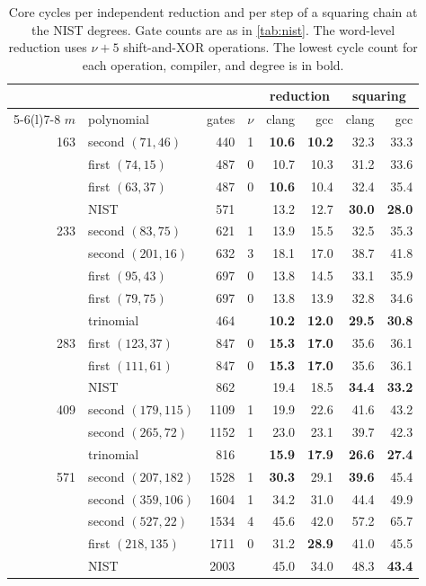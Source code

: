 \documentclass{ieeeaccess}
\theoremstyle{plain}
\theoremstyle{definition}
\begin{document}
\begin{table}[t]
\centering\small
\caption{Core cycles per independent reduction and per step of a
squaring chain at the NIST degrees. Gate counts are as in
\cref{tab:nist}. The word-level reduction uses $\nu+5$
shift-and-XOR operations. The lowest cycle count for each operation,
compiler, and degree is in bold.}
\label{tab:software}
\setlength{\tabcolsep}{2.5pt}
\begin{tabular}{@{}r l r c r r r r@{}}
\toprule
 & & & & \multicolumn{2}{c}{reduction} & \multicolumn{2}{c}{squaring}\\
\cmidrule(lr){5-6}\cmidrule(l){7-8}
$m$ & polynomial & gates & $\nu$ & clang & gcc & clang & gcc\\
\midrule
163 & second $(71,46)$   &  440 & 1 & \textbf{10.6} & \textbf{10.2} & 32.3 & 33.3\\
    & first $(74,15)$    &  487 & 0 & 10.7 & 10.3 & 31.2 & 33.6\\
    & first $(63,37)$    &  487 & 0 & \textbf{10.6} & 10.4 & 32.4 & 35.4\\
    & NIST               &  571 &   & 13.2 & 12.7 & \textbf{30.0} & \textbf{28.0}\\
\midrule
233 & second $(83,75)$   &  621 & 1 & 13.9 & 15.5 & 32.5 & 35.3\\
    & second $(201,16)$  &  632 & 3 & 18.1 & 17.0 & 38.7 & 41.8\\
    & first $(95,43)$    &  697 & 0 & 13.8 & 14.5 & 33.1 & 35.9\\
    & first $(79,75)$    &  697 & 0 & 13.8 & 13.9 & 32.8 & 34.6\\
    & trinomial          &  464 &   & \textbf{10.2} & \textbf{12.0} & \textbf{29.5} & \textbf{30.8}\\
\midrule
283 & first $(123,37)$   &  847 & 0 & \textbf{15.3} & \textbf{17.0} & 35.6 & 36.1\\
    & first $(111,61)$   &  847 & 0 & \textbf{15.3} & \textbf{17.0} & 35.6 & 36.1\\
    & NIST               &  862 &   & 19.4 & 18.5 & \textbf{34.4} & \textbf{33.2}\\
\midrule
409 & second $(179,115)$ & 1109 & 1 & 19.9 & 22.6 & 41.6 & 43.2\\
    & second $(265,72)$  & 1152 & 1 & 23.0 & 23.1 & 39.7 & 42.3\\
    & trinomial          &  816 &   & \textbf{15.9} & \textbf{17.9} & \textbf{26.6} & \textbf{27.4}\\
\midrule
571 & second $(207,182)$ & 1528 & 1 & \textbf{30.3} & 29.1 & \textbf{39.6} & 45.4\\
    & second $(359,106)$ & 1604 & 1 & 34.2 & 31.0 & 44.4 & 49.9\\
    & second $(527,22)$  & 1534 & 4 & 45.6 & 42.0 & 57.2 & 65.7\\
    & first $(218,135)$  & 1711 & 0 & 31.2 & \textbf{28.9} & 41.0 & 45.5\\
    & NIST               & 2003 &   & 45.0 & 34.0 & 48.3 & \textbf{43.4}\\
\bottomrule
\end{tabular}
\end{table}
\end{document}
